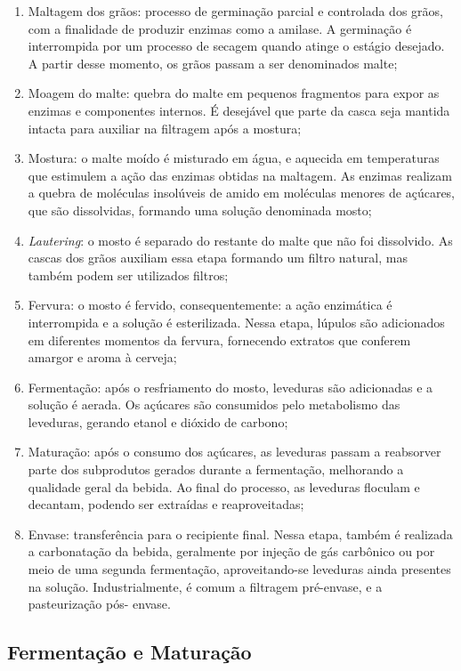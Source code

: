 \begin{enumerate}
    \item Maltagem dos grãos: processo de germinação parcial e controlada dos grãos, com a finalidade
de produzir enzimas como a amilase. A germinação é interrompida por um processo de secagem quando atinge o estágio desejado.
A partir desse momento, os grãos passam a ser denominados malte;
    \item Moagem do malte: quebra do malte em pequenos fragmentos para expor as enzimas e componentes internos. É desejável
que parte da casca seja mantida intacta para auxiliar na filtragem após a mostura;
    \item Mostura: o malte moído é misturado em água, e aquecida em temperaturas
que estimulem a ação das enzimas obtidas na maltagem. As enzimas
realizam a quebra de moléculas insolúveis de amido em moléculas menores
de açúcares, que são dissolvidas, formando uma solução denominada mosto;
    \item \textit{Lautering}: o mosto é separado do restante do malte que não foi dissolvido. As
cascas dos grãos auxiliam essa etapa formando um filtro natural, mas também podem ser utilizados filtros;
    \item Fervura: o mosto é fervido, consequentemente: a ação enzimática é
interrompida e a solução é esterilizada. Nessa etapa, lúpulos são adicionados em diferentes
momentos da fervura, fornecendo extratos que conferem amargor e aroma à cerveja;
    \item Fermentação: após o resfriamento do mosto, leveduras são adicionadas e a solução é aerada. 
Os açúcares são consumidos pelo metabolismo das leveduras, gerando etanol e dióxido de carbono;
    \item Maturação: após o consumo dos açúcares, as leveduras passam a reabsorver parte dos
subprodutos gerados durante a fermentação, melhorando a qualidade geral da bebida. Ao final do processo, as leveduras floculam e decantam, podendo ser extraídas e reaproveitadas;
    \item Envase: transferência para o recipiente final. Nessa etapa, também é
realizada a carbonatação da bebida, geralmente por injeção de gás carbônico
ou por meio de uma segunda fermentação, aproveitando-se leveduras ainda presentes na solução.
Industrialmente, é comum a filtragem pré-envase, e a pasteurização pós-
envase.
\end{enumerate}

\subsection{Fermentação e Maturação}

